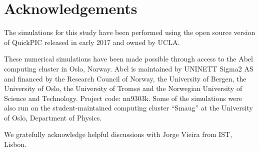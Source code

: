 \documentclass[aps,prstab,reprint,amsmath,amssymb,groupedaddress]{revtex4-1}
\begin{document}
\section{Acknowledgements}\label{Ack}

The simulations for this study have been performed using the open source version of QuickPIC released in early 2017
and owned by UCLA.

These numerical simulations have been made possible through access to the Abel computing cluster in Oslo, Norway. Abel
is maintained by UNINETT Sigma2 AS and financed by the Research Council of Norway, the University of Bergen, the
University of Oslo, the University of Troms{\o} and the Norwegian University of Science and Technology. Project code:
nn9303k. Some of the simulations were also run on the student-maintained computing cluster ``Smaug'' at the University
of Oslo, Department of Physics.

We gratefully acknowledge helpful discussions with Jorge Vieira from IST, Lisbon. 


\end{document}
